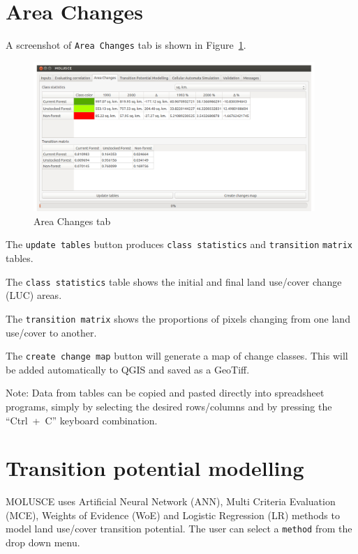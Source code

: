 \documentclass{report}
\begin{document}
\section{Area Changes}

A screenshot of \verb+Area Changes+ tab is shown in Figure~\ref{fig:changes_tab}.

\begin{figure}[h!]
\centering
\includegraphics[width=0.95\textwidth]{img/changes_tab.png}
\caption{Area Changes tab}
\label{fig:changes_tab}
\end{figure}

The \verb+update tables+ button produces \verb+class statistics+ and \verb+transition+ \verb+matrix+ tables.

The \verb+class statistics+ table shows the initial and final land use/cover change (LUC) areas.

The \verb+transition matrix+ shows the proportions of pixels changing from one land use/cover to another.

The \verb+create change map+ button will generate a map of change classes. This will be added
automatically to QGIS and saved as a GeoTiff.

Note: Data from tables can be copied and pasted directly into spreadsheet programs, simply by
selecting the desired rows/columns and by pressing the “Ctrl~+~C” keyboard combination.

\section{Transition potential modelling}
MOLUSCE uses Artificial Neural Network (ANN), Multi Criteria Evaluation (MCE), Weights of
Evidence (WoE) and Logistic Regression (LR) methods to model land use/cover transition
potential. The user can select a \verb+method+ from the drop down menu.
\end{document}
